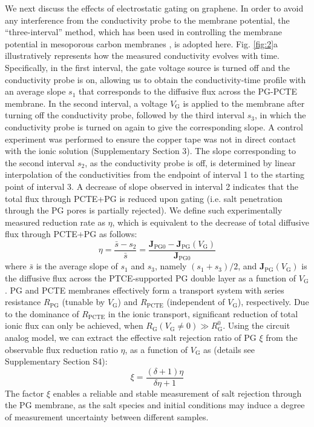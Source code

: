 \documentclass[journal=langd5,email=true, hyperref=true, keywords=false]{achemso}
\newcommand{\Fig}{Fig.}
\begin{document}
We next discuss the effects of electrostatic gating on graphene. In
order to avoid any interference from the conductivity probe to the
membrane potential, the “three-interval” method, which has been used
in controlling the membrane potential in mesoporous carbon membranes
\cite{Surwade_2014}, is adopted here. \Fig{} \ref{fig:2}a
illustratively represents how the measured conductivity evolves with
time. Specifically, in the first interval, the gate voltage source is
turned off and the conductivity probe is on, allowing us to obtain the
conductivity-time profile with an average slope $s_{1}$ that
corresponds to the diffusive flux across the PG-PCTE membrane. In the
second interval, a voltage $V_{\mathrm{G}}$ is applied to the membrane
after turning off the conductivity probe, followed by the third
interval $s_{3}$, in which the conductivity probe is turned on again
to give the corresponding slope. A control experiment was performed to
ensure the copper tape was not in direct contact with the ionic
solution (Supplementary Section 3). The slope corresponding to the
second interval $s_{2}$, as the conductivity probe is off, is
determined by linear interpolation of the conductivities from the
endpoint of interval 1 to the starting point of interval 3. A decrease
of slope observed in interval 2 indicates that the total flux through
PCTE+PG is reduced upon gating (i.e. salt penetration through the PG
pores is partially rejected). We define such experimentally measured
reduction rate as $\eta$, which is equivalent to the decrease of total
diffusive flux through PCTE+PG as follows:
\begin{equation}
  \label{eq:rejection}
  \eta = \frac{\bar{s} - s_{2}}{\bar{s}} = \frac{\boldsymbol{J}_{\mathrm{PG0}}
    - \boldsymbol{J}_{\mathrm{PG}}(V_{\mathrm{G}})}{\boldsymbol{J}_{\mathrm{PG0}}}
\end{equation}
where $\bar{s}$ is the average slope of $s_{1}$ and $s_{3}$, namely
$(s_{1} + s_{3})/2$, and
$\boldsymbol{J}_{\mathrm{PG}}(V_{\mathrm{G}})$ is the diffusive flux
across the PTCE-supported PG double layer as a function of
$V_{\mathrm{G}}$. PG and PCTE membranes effectively form a transport
system with series resistance $R_{\mathrm{PG}}$ (tunable by
$V_{\mathrm{G}}$) and $R_{\mathrm{PCTE}}$ (independent of
$V_{\mathrm{G}}$), respectively. Due to the dominance of
$R_{\mathrm{PCTE}}$ in the ionic transport, significant reduction of
total ionic flux can only be achieved, when
$R_{\mathrm{\mathrm{G}}}(V_{\mathrm{G}} \neq 0) \gg
R_{\mathrm{\mathrm{G}}}^{0}$. Using the circuit analog model, we can
extract the effective salt rejection ratio of PG $\xi$ from the
observable flux reduction ratio $\eta$, as a function of
$V_{\mathrm{G}}$ as (details see Supplementary Section S4):
\begin{equation}
\label{eq:xi-def}
\xi = \frac{(\delta+1) \eta}{\delta \eta + 1}
\end{equation}
The factor $\xi$ enables a reliable and stable measurement of salt
rejection through the PG membrane, as the salt species and initial
conditions may induce a degree of measurement uncertainty between
different samples.
\end{document}

